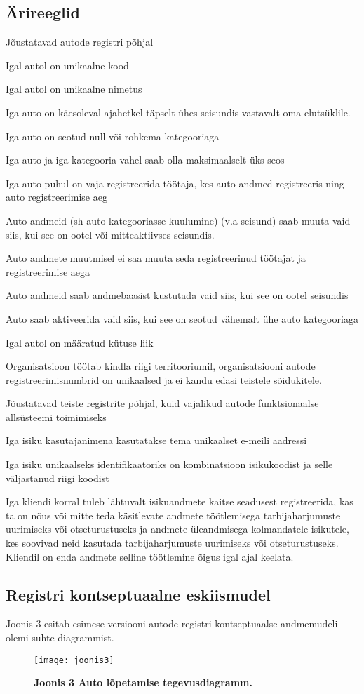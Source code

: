 \subsection{Ärireeglid}
Jõustatavad autode registri põhjal
\begin{myitemize}
	\item Igal autol on unikaalne kood
	\item Igal autol on unikaalne nimetus
	\item Iga auto on käesoleval ajahetkel täpselt ühes seisundis vastavalt oma elutsüklile.
	\item Iga auto on seotud null või rohkema kategooriaga
	\item Iga auto ja iga kategooria vahel saab olla maksimaalselt üks seos
	\item Iga auto puhul on vaja registreerida töötaja, kes auto andmed registreeris ning auto registreerimise aeg
	\item Auto andmeid (sh auto kategooriasse kuulumine) (v.a seisund) saab muuta vaid siis, kui see on ootel või mitteaktiivses seisundis. 
	\item Auto andmete muutmisel ei saa muuta seda registreerinud töötajat ja registreerimise aega
	\item Auto andmeid saab andmebaasist kustutada vaid siis, kui see on ootel seisundis
	\item Auto saab aktiveerida vaid siis, kui see on seotud vähemalt ühe auto kategooriaga
	\item Igal autol on määratud kütuse liik
	\item Organisatsioon töötab kindla riigi territooriumil, organisatsiooni autode registreerimisnumbrid on unikaalsed ja ei kandu edasi teistele sõidukitele.
\end{myitemize}

\noindent Jõustatavad teiste registrite põhjal, kuid vajalikud autode funktsionaalse allsüsteemi toimimiseks
\begin{myitemize}
	\item Iga isiku kasutajanimena kasutatakse tema unikaalset e-meili aadressi
	\item Iga isiku unikaalseks identifikaatoriks on kombinatsioon isikukoodist ja selle väljastanud riigi koodist
	\item Iga kliendi korral tuleb lähtuvalt isikuandmete kaitse seadusest registreerida, kas ta on nõus või mitte teda käsitlevate andmete töötlemisega tarbijaharjumuste uurimiseks või otseturustuseks ja andmete üleandmisega kolmandatele isikutele, kes soovivad neid kasutada tarbijaharjumuste uurimiseks või otseturustuseks. Kliendil on enda andmete selline töötlemine õigus igal ajal keelata.
\end{myitemize}

\subsection{Registri kontseptuaalne eskiismudel}
\colorbox{light-gray}{Joonis 3} esitab esimese versiooni autode registri kontseptuaalse andmemudeli olemi‑suhte diagrammist.
\begin{figure}[H]
	\texttt{[image: joonis3]}
	\caption{\textbf{Joonis 3 Auto lõpetamise tegevusdiagramm.}}
\end{figure}